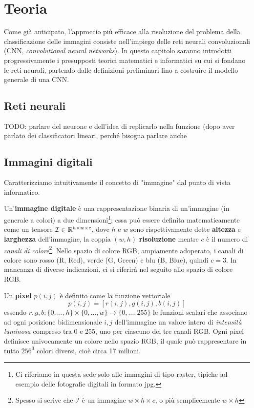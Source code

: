 \chapter{Teoria}\label{teoria}
\pagestyle{fancy}
\fancyhf{}
\fancyhead[OL]{\rightmark}
\cfoot{\thepage}

Come già anticipato, l'approccio più efficace alla risoluzione del problema della classificazione delle immagini consiste nell'impiego delle reti neurali convoluzionali (CNN, \emph{convolutional neural networks}). In questo capitolo saranno introdotti progressivamente i presupposti teorici matematici e informatici su cui si fondano le reti neurali, partendo dalle definizioni preliminari fino a costruire il modello generale di una CNN.



\section{Reti neurali}

TODO: parlare del neurone e dell'idea di replicarlo nella funzione (dopo aver parlato dei classificatori lineari, perché bisogna parlare anche 

\section{Immagini digitali}
Caratterizziamo intuitivamente il concetto di "immagine" dal punto di vista informatico.

Un'\textbf{immagine digitale} è una rappresentazione binaria di un'immagine (in generale a colori) a due dimensioni\footnote{Ci riferiamo in questa sede solo alle immagini di tipo raster, tipiche ad esempio delle fotografie digitali in formato jpg.}; essa può essere definita matematicamente come un tensore $\mathcal{I}\in\mathbb{R}^{h\times w\times c}$, dove $h$ e $w$ sono rispettivamente dette \textbf{altezza} e \textbf{larghezza} dell'immagine, la coppia $(w,h)$ \textbf{risoluzione} mentre $c$ è il numero di \emph{canali di colore}\footnote{Spesso si scrive che $\mathcal{I}$ è un immagine $w\times h\times c$, o più semplicemente $w\times h$}. Nello spazio di colore RGB, ampiamente adoperato, i canali di colore sono rosso (R, Red), verde (G, Green) e blu (B, Blue), quindi $c=3$. In mancanza di diverse indicazioni, ci si riferirà nel seguito allo spazio di colore RGB.

Un \textbf{pixel} $p(i,j)$ è definito come la funzione vettoriale
\[p(i,j)=[r(i,j),g(i,j),b(i,j)]\]
essendo $r,g,b:\{0,\dots,h\}\times\{0,\dots,w\}\to\{0,\dots,255\}$ le funzioni scalari che associano ad ogni posizione bidimensionale $i,j$ dell'immagine un valore intero di \emph{intensità luminosa} compreso tra 0 e 255, uno per ciascuno dei tre canali RGB. Ogni pixel definisce univocamente un colore nello spazio RGB, il quale può rappresentare in tutto $256^{3}$ colori diversi, cioè circa 17 milioni.

